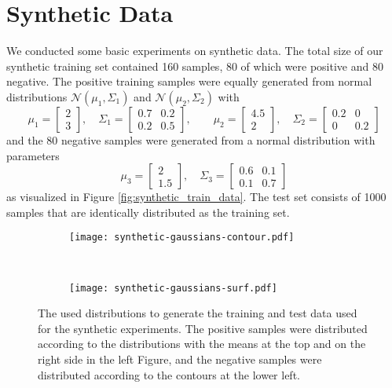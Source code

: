 \section{Synthetic Data}
We conducted some basic experiments on synthetic data. 
The total size of our synthetic training set contained 160 samples, 80 of which were positive and 80 negative. 
The positive training samples were equally generated from normal distributions $\mathcal{N}(\mu_1,\Sigma_1)$ and $\mathcal{N}(\mu_2, \Sigma_2)$ with 
$$\mu_1= \begin{bmatrix}2 \\ 3 \end{bmatrix}, \quad \Sigma_1 = \begin{bmatrix}0.7 & 0.2 \\ 0.2 & 0.5 \end{bmatrix}, \qquad \mu_2 = \begin{bmatrix}4.5 \\ 2 \end{bmatrix}, \quad \Sigma_2 = \begin{bmatrix} 0.2 & 0 \\ 0 & 0.2 \end{bmatrix}$$
and the 80 negative samples were generated from a normal distribution with parameters 
$$\mu_3 = \begin{bmatrix} 2\\1.5\end{bmatrix}, \quad \Sigma_3 = \begin{bmatrix}0.6 & 0.1\\ 0.1 & 0.7\end{bmatrix}$$
as visualized in Figure \ref{fig:synthetic_train_data}. The test set consists of 1000 samples that are identically distributed as the training set.
\begin{figure}[ht]
	\centering
	\begin{subfigure}[h]{0.45\textwidth}
	\texttt{[image: synthetic-gaussians-contour.pdf]}	
	\end{subfigure}
	~
	\begin{subfigure}[h]{0.45\textwidth}
	\texttt{[image: synthetic-gaussians-surf.pdf]}	
	\end{subfigure}
	\caption{The used distributions to generate the training and test data used for the synthetic experiments. The positive samples were distributed according to the distributions with the means at the top and on the right side in the left Figure, and the negative samples were distributed according to the contours at the lower left.}
	\label{fig:synthetic-gaussians}
\end{figure}

